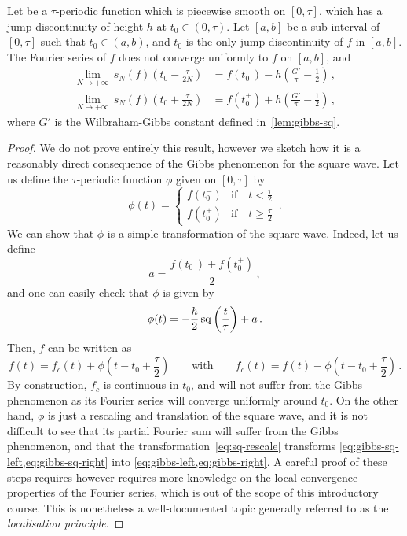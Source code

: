 \begin{theorem}
	Let be a $\tau$-periodic function which is piecewise smooth on $[0,\tau]$, which has a
	jump discontinuity of height $h$ at $t_0\in(0,\tau)$. Let $[a,b]$ be a sub-interval of
	$[0,\tau]$ such that $t_0\in(a,b)$, and $t_0$ is the only jump discontinuity of $f$ in
	$[a,b]$. The Fourier series of $f$ does not converge uniformly to $f$ on $[a,b]$, and
	\begin{align}
		\lim_{N\to+\infty}\,s_N(f)\left(t_0-\frac{\tau}{2N}\right)
		 & =f(t_0^-)-h\left(\frac{G'}{\pi}-\frac12\right)\,,\label{eq:gibbs-left}  \\
		\lim_{N\to+\infty}\,s_N(f)\left(t_0+\frac{\tau}{2N}\right)
		 & =f(t_0^+)+h\left(\frac{G'}{\pi}-\frac12\right)\,,\label{eq:gibbs-right}
	\end{align}
	where $G'$ is the Wilbraham-Gibbs constant defined in~\cref{lem:gibbs-sq}.
\end{theorem}
\begin{proof}
	We do not prove entirely this result, however we sketch how it is a reasonably direct
	consequence of the Gibbs phenomenon for the square wave. Let us define the
	$\tau$-periodic function $\phi$ given on $[0,\tau]$ by
	\begin{equation}
		\phi(t)=
		\begin{cases}
			f(t_0^-) & \text{if}\quad t<\frac{\tau}{2}     \\
			f(t_0^+) & \text{if}\quad t\geq \frac{\tau}{2}
		\end{cases}\,.
	\end{equation}
	We can show that $\phi$ is a simple transformation of the square wave. Indeed, let us
	define
	\begin{equation}
		a=\frac{f(t_0^-)+f(t_0^+)}{2}\,,
	\end{equation}
	and one can easily check that $\phi$ is given by
	\begin{equation}
		\phi(t)=-\frac{h}{2}\operatorname{sq}\left(\frac{t}{\tau}\right)+a\,.\label{eq:sq-rescale}
	\end{equation}
	Then, $f$ can be written as
	\begin{equation}
		f(t)=f_c(t)+\phi\left(t-t_0+\frac{\tau}{2}\right)\qquad\text{with}\qquad f_c(t)=f(t)
		-\phi\left(t-t_0+\frac{\tau}{2}\right)\,.
	\end{equation}
	By construction, $f_c$ is continuous in $t_0$, and will not suffer from the Gibbs
	phenomenon as its Fourier series will converge uniformly around $t_0$. On the other
	hand, $\phi$ is just a rescaling and translation of the square wave, and it is not
	difficult to see that its partial Fourier sum will suffer from the Gibbs phenomenon, and
	that the transformation~\cref{eq:sq-rescale} transforms
	\cref{eq:gibbs-sq-left,eq:gibbs-sq-right} into \cref{eq:gibbs-left,eq:gibbs-right}. A
	careful proof of these steps requires however requires more knowledge on the local
	convergence properties of the Fourier series, which is out of the scope of this
	introductory course. This is nonetheless a well-documented topic generally referred to
	as the \emph{localisation principle}.
\end{proof}
